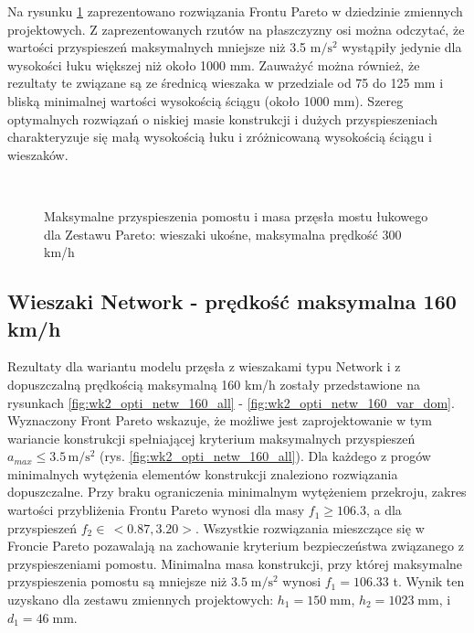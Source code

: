 Na rysunku \ref{fig:wk2_opti_niels_300_var_dom} zaprezentowano rozwiązania Frontu Pareto w dziedzinie zmiennych projektowych. Z zaprezentowanych rzutów na płaszczyzny osi można odczytać, że wartości przyspieszeń maksymalnych mniejsze niż  3.5 $\mathrm{m/s^2}$ wystąpiły jedynie dla wysokości łuku większej niż około 1000 mm. Zauważyć można również, że rezultaty te związane są ze średnicą wieszaka w przedziale od 75 do 125 mm i bliską minimalnej wartości wysokością ściągu (około 1000 mm). Szereg optymalnych rozwiązań o niskiej masie konstrukcji i dużych przyspieszeniach charakteryzuje się małą wysokością łuku i zróżnicowaną wysokością ściągu i wieszaków.


\begin{figure}[hbt!]
	\centering
	\\
	\captionsetup{justification=centering}
	\caption{Maksymalne przyspieszenia pomostu i masa przęsła mostu łukowego dla Zestawu Pareto: wieszaki ukośne, maksymalna prędkość 300 km/h}
	\label{fig:wk2_opti_niels_300_var_dom}
\end{figure}





\pagebreak[4]
\subsection{Wieszaki Network - prędkość maksymalna 160 km/h}

Rezultaty dla wariantu modelu przęsła z wieszakami typu Network i z dopuszczalną prędkością maksymalną 160 km/h zostały przedstawione na rysunkach \ref{fig:wk2_opti_netw_160_all} - \ref{fig:wk2_opti_netw_160_var_dom}. Wyznaczony Front Pareto wskazuje, że możliwe jest zaprojektowanie w tym wariancie konstrukcji spełniającej kryterium maksymalnych przyspieszeń $a_{max}\le 3.5\,\mathrm{m/s^2}$ (rys. \ref{fig:wk2_opti_netw_160_all}). Dla każdego z progów minimalnych wytężenia elementów konstrukcji znaleziono rozwiązania dopuszczalne. Przy braku ograniczenia minimalnym wytężeniem przekroju, zakres wartości przybliżenia Frontu Pareto wynosi dla masy $f_1 \ge 106.3$, a dla przyspieszeń $f_2 \in\,<0.87,3.20>$. Wszystkie rozwiązania mieszczące się w Froncie Pareto pozawalają na zachowanie kryterium bezpieczeństwa związanego z przyspieszeniami pomostu. Minimalna masa konstrukcji, przy której maksymalne przyspieszenia pomostu są mniejsze niż $3.5\;\mathrm{m/s^2}$ wynosi $f_1 = 106.33$ t. Wynik ten uzyskano dla zestawu zmiennych projektowych: $h_1 = 150\;\mathrm{mm}$, $h_2 = 1023\;\mathrm{mm}$, i $d_1 = 46\;\mathrm{mm}$.

